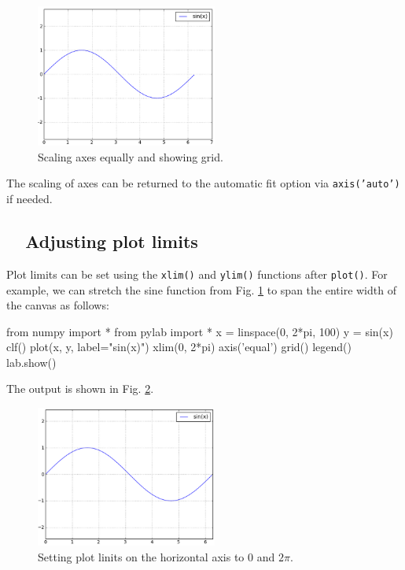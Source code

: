 \begin{figure}[!ht]
\begin{center}
\includegraphics[width=0.53\textwidth]{imgp/plot8.png}
\end{center}
\vspace{-4mm}
\caption{Scaling axes equally and showing grid.}
\label{fig:plot8}
\vspace{-2mm}
\end{figure}
\noindent
The scaling of axes can be returned to the automatic fit option via
{\tt axis('auto')} if needed.

\subsection{\ \ Adjusting plot limits}

Plot limits can be set using the {\tt xlim()} and {\tt ylim()}
functions after {\tt plot()}. For example, we can stretch the sine
function from Fig. \ref{fig:plot8} to span the entire width of the 
canvas as follows:

\begin{bluecode}
from numpy import *
from pylab import *
x = linspace(0, 2*pi, 100)
y = sin(x)
clf()
plot(x, y, label="sin(x)")
xlim(0, 2*pi)
axis('equal')
grid()
legend()
lab.show()
\end{bluecode}
\noindent
The output is shown in Fig. \ref{fig:plot9}.
\newpage

\begin{figure}[!ht]
\begin{center}
\includegraphics[width=0.53\textwidth]{imgp/plot9.png}
\end{center}
\vspace{-4mm}
\caption{Setting plot linits on the horizontal axis to $0$ and $2\pi$.}
\label{fig:plot9}
\vspace{-2mm}
\end{figure}
\noindent


